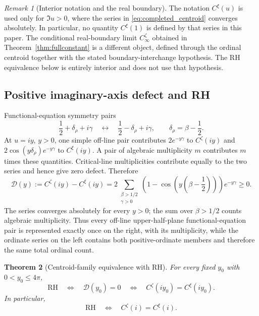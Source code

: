 \documentclass[11pt]{amsart}
\numberwithin{equation}{section}
\newtheorem{theorem}{Theorem}[section]
\theoremstyle{definition}
\theoremstyle{remark}
\newtheorem{remark}[theorem]{Remark}
\newcommand{\RH}{\mathrm{RH}}
\begin{document}
\begin{remark}[Interior notation and the real boundary]\label{rem:completed_centroid_boundary}
The notation $C^{\xi}(u)$ is used only for $\Im u>0$, where the series in \eqref{eq:completed_centroid} converges absolutely. In particular, no quantity $C^{\xi}(1)$ is defined by that series in this paper. The conditional real-boundary limit $C_\infty^{\zeta}$ obtained in Theorem~\ref{thm:fullconstant} is a different object, defined through the ordinal centroid together with the stated boundary-interchange hypothesis. The RH equivalence below is entirely interior and does not use that hypothesis.
\end{remark}

\subsection{Positive imaginary-axis defect and RH}\label{subsec:positive_centroid_defect}
Functional-equation symmetry pairs
\begin{equation}\label{eq:functional_pair_same_ordinate}
\frac12+\delta_\rho+i\gamma
\quad\longleftrightarrow\quad
\frac12-\delta_\rho+i\gamma,
\qquad
\delta_\rho=\beta-\frac12.
\end{equation}
At $u=iy$, $y>0$, one simple off-line pair contributes $2e^{-y\gamma}$ to $C^{\zeta}(iy)$ and $2\cos(y\delta_\rho)e^{-y\gamma}$ to $C^{\xi}(iy)$. A pair of algebraic multiplicity $m$ contributes $m$ times these quantities. Critical-line multiplicities contribute equally to the two series and hence give zero defect. Therefore
\begin{equation}\label{eq:positive_imaginary_defect}
\boxed{
\mathcal D(y)
:=C^{\zeta}(iy)-C^{\xi}(iy)
=2\sum_{\substack{\beta>1/2\\\gamma>0}}
\left(1-\cos\!\left(y\left(\beta-\frac12\right)\right)\right)e^{-y\gamma}
\ge0.}
\end{equation}
The series converges absolutely for every $y>0$; the sum over $\beta>1/2$ counts algebraic multiplicity. Thus every off-line upper-half-plane functional-equation pair is represented exactly once on the right, with its multiplicity, while the ordinate series on the left contains both positive-ordinate members and therefore the same total ordinal count.

\begin{theorem}[Centroid-family equivalence with RH]\label{thm:centroid_RH_equivalence}
For every fixed $y_0$ with $0<y_0\le4\pi$,
\begin{equation}\label{eq:centroid_RH_equivalence}
\boxed{
\RH
\quad\Longleftrightarrow\quad
\mathcal D(y_0)=0
\quad\Longleftrightarrow\quad
C^{\zeta}(iy_0)=C^{\xi}(iy_0).}
\end{equation}
In particular,
\begin{equation}\label{eq:centroid_RH_equivalence_y1}
\boxed{\RH\quad\Longleftrightarrow\quad C^{\zeta}(i)=C^{\xi}(i).}
\end{equation}
\end{theorem}
\end{document}

